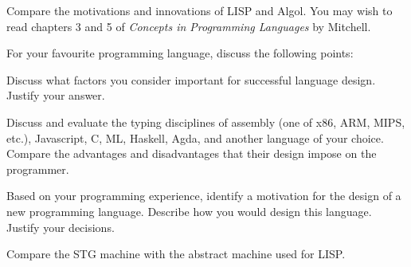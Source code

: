 \documentclass{supervision}
\begin{document}
  \begin{questions}
    \question Compare the motivations and innovations of LISP and Algol. You
      may wish to read chapters 3 and 5 of \emph{Concepts in Programming
      Languages} by Mitchell.

    \question For your favourite programming language, discuss the following
      points:


    \question Discuss what factors you consider important for successful
      language design. Justify your answer.

    \question Discuss and evaluate the typing disciplines of assembly (one of
      x86, ARM, MIPS, etc.), Javascript, C, ML, Haskell, Agda, and another
      language of your choice. Compare the advantages and disadvantages that
      their design impose on the programmer.

    \question Based on your programming experience, identify a motivation for
      the design of a new programming language. Describe how you would design this language. Justify your decisions.

    \question Compare the STG machine with the abstract machine used for LISP.
  
  \end{questions}
\end{document}
